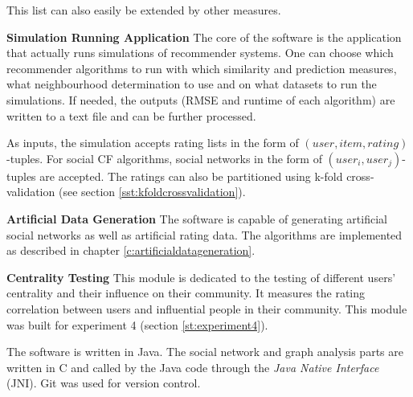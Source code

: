 This list can also easily be extended by other measures.
\newline

\textbf{Simulation Running Application} The core of the software is the application that actually runs simulations of recommender systems. One can choose which recommender algorithms to run with which similarity and prediction measures, what neighbourhood determination to use and on what datasets to run the simulations. If needed, the outputs (RMSE and runtime of each algorithm) are written to a text file and can be further processed.

As inputs, the simulation accepts rating lists in the form of $(user,item,rating)$-tuples. For social CF algorithms, social networks in the form of $(user_i,user_j)$-tuples are accepted. The ratings can also be partitioned using k-fold cross-validation (see section \ref{sst:kfoldcrossvalidation}).
\newline

\textbf{Artificial Data Generation} The software is capable of generating artificial social networks as well as artificial rating data. The algorithms are implemented as described in chapter \ref{c:artificialdatageneration}.
\newline

\textbf{Centrality Testing} This module is dedicated to the testing of different users' centrality and their influence on their community. It measures the rating correlation between users and influential people in their community. This module was built for experiment 4 (section \ref{st:experiment4}).
\newline

The software is written in Java. The social network and graph analysis parts are written in C and called by the Java code through the \textit{Java Native Interface} (JNI). Git was used for version control.